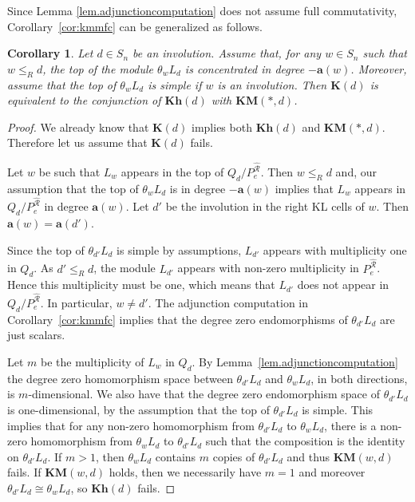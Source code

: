 \documentclass[a4paper]{amsart}
\newtheorem{corollary}[theorem]{Corollary}
\def\HK#1{\textcolor[rgb]{.75,0.00,0.00}{[HK: #1]}}
\begin{document}
Since Lemma \ref{lem.adjunctioncomputation} does not assume full commutativity, Corollary~\ref{cor:kmmfc} can be generalized as follows.

\begin{corollary}\label{cor:nicecase}
Let $d\in S_n$ be an involution. Assume that, for any $w\in S_n$
such that $w\leq_R d$, the top of  the module $\theta_w L_d$ 
is concentrated in degree $-\mathbf{a}(w)$. Moreover, assume that 
the top of $\theta_w L_d$ is simple if $w$ is an involution.
Then $\mathbf{K}(d)$ is equivalent to
the conjunction of $\mathbf{Kh}(d)$ with $\mathbf{KM}(*,d)$.
\end{corollary}

\begin{proof}
We already know that $\mathbf{K}(d)$ implies both 
$\mathbf{Kh}(d)$ and $\mathbf{KM}(*,d)$. Therefore
let us assume that $\mathbf{K}(d)$ fails.

Let $w$ be such that $L_w$ appears in the top of
$Q_d/P_e^{\hat{\mathcal{R}}}$. Then $w\leq_R d$
and, our assumption that the top of $\theta_wL_d$ is in degree $-\mathbf{a}(w)$ implies that 
$L_w$ appears in $Q_d/P_e^{\hat{\mathcal{R}}}$ 
in degree $\mathbf{a}(w)$. Let $d'$ be the involution
in the right KL cells of $w$. Then $\mathbf{a}(w)=\mathbf{a}(d')$.

Since the top of $\theta_{d'}L_d$ is simple by assumptions,
$L_{d'}$ appears with multiplicity one in  $Q_d$.
As $d'\leq_R d$, the module $L_{d'}$ appears with non-zero multiplicity
in $P_e^{\hat{\mathcal{R}}}$. Hence this multiplicity must be one,
which means that $L_{d'}$ does not appear in $Q_d/P_e^{\hat{\mathcal{R}}}$.
In particular, $w\neq d'$.
The adjunction computation in Corollary~\ref{cor:kmmfc} implies
that the degree zero endomorphisms of $\theta_{d'}L_d$ are just scalars.

Let $m$ be the multiplicity of $L_{w}$ in $Q_d$. 
By Lemma~\ref{lem.adjunctioncomputation} 
the degree zero homomorphism space between 
$\theta_{d'}L_d$ and $\theta_w L_d$, in both directions,
is $m$-dimensional. We also have that the 
degree zero endomorphism space of 
$\theta_{d'}L_d$ is one-dimensional, by the assumption that 
the top of $\theta_{d'}L_d$ is simple.
This implies that for any non-zero homomorphism from 
$\theta_{d'}L_d$ to $\theta_w L_d$, there is a non-zero
homomorphism from $\theta_w L_d$ to $\theta_{d'}L_d$
such that the composition is the identity on $\theta_{d'}L_d$.
If $m>1$, then $\theta_w L_d$ contains $m$ copies of $\theta_{d'}L_d$ and thus $\mathbf{KM}(w,d)$ fails. If $\mathbf{KM}(w,d)$ holds, then we necessarily have $m=1$ and moreover $\theta_{d'}L_d\cong \theta_w L_d$, so $\mathbf{Kh}(d)$ fails.
\end{proof}
\end{document}
